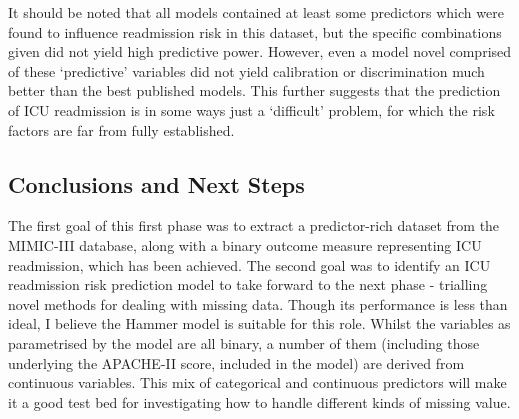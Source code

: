 \documentclass[onecolumn]{article}
\begin{document}
It should be noted that all models contained at least some predictors which were found to influence readmission risk in this dataset, but the specific combinations given did not yield high predictive power. However, even a model novel comprised of these `predictive' variables did not yield calibration or discrimination much better than the best published models. This further suggests that the prediction of ICU readmission is in some ways just a `difficult' problem, for which the risk factors are far from fully established.

\subsection{Conclusions and Next Steps}

The first goal of this first phase was to extract a predictor-rich dataset from the MIMIC-III database, along with a binary outcome measure representing ICU readmission, which has been achieved. The second goal was to identify an ICU readmission risk prediction model to take forward to the next phase - trialling novel methods for dealing with missing data. Though its performance is less than ideal, I believe the Hammer model is suitable for this role. Whilst the variables as parametrised by the model are all binary, a number of them (including those underlying the APACHE-II score, included in the model) are derived from continuous variables. This mix of categorical and continuous predictors will make it a good test bed for investigating how to handle different kinds of missing value.

\begin{multicols}{2}

{\small
}

\end{multicols}
\end{document}
